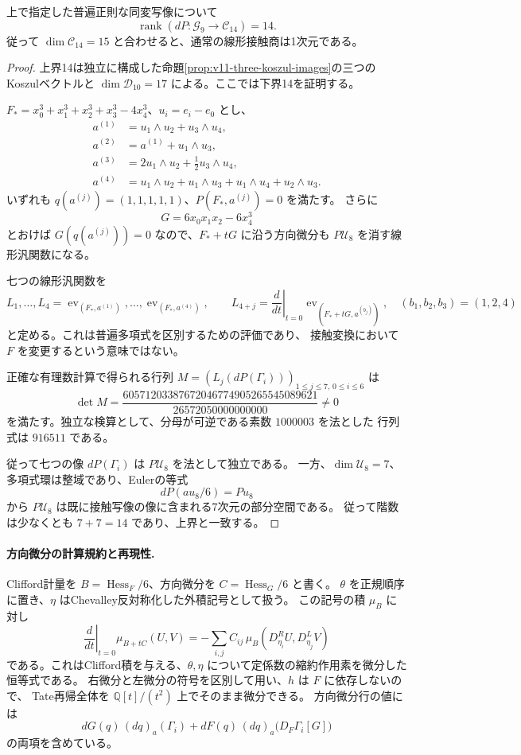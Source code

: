 \begin{proposition}[14次の接触階数]
\label{prop:v11-contact-rank-fourteenth}
上で指定した普遍正則な同変写像について
\[
 \operatorname{rank}(dP\colon\mathcal G_9\longrightarrow\mathcal C_{14})=14.
\]
従って $\dim\mathcal C_{14}=15$ と合わせると、通常の線形接触商は1次元である。
\end{proposition}
\begin{proof}
上界14は独立に構成した命題\ref{prop:v11-three-koszul-images}の三つのKoszulベクトルと
$\dim\mathcal D_{10}=17$ による。ここでは下界14を証明する。

$F_*=x_0^3+x_1^3+x_2^3+x_3^3-4x_4^3$、$u_i=e_i-e_0$ とし、
\begin{align*}
 a^{(1)}&=u_1\wedge u_2+u_3\wedge u_4,\\
 a^{(2)}&=a^{(1)}+u_1\wedge u_3,\\
 a^{(3)}&=2u_1\wedge u_2+\tfrac12u_3\wedge u_4,\\
 a^{(4)}&=u_1\wedge u_2+u_1\wedge u_3
              +u_1\wedge u_4+u_2\wedge u_3.
\end{align*}
いずれも $q(a^{(j)})=(1,1,1,1,1)$、$P(F_*,a^{(j)})=0$ を満たす。
さらに
\[
 G=6x_0x_1x_2-6x_4^3
\]
とおけば $G(q(a^{(j)}))=0$ なので、$F_*+tG$ に沿う方向微分も
$P\mathcal U_8$ を消す線形汎関数になる。

七つの線形汎関数を
\[
 L_1,\ldots,L_4=\operatorname{ev}_{(F_*,a^{(1)})},\ldots,
                   \operatorname{ev}_{(F_*,a^{(4)})},
 \qquad
 L_{4+j}=\left.\frac{d}{dt}\right|_{t=0}
             \operatorname{ev}_{(F_*+tG,a^{(b_j)})},
 \quad (b_1,b_2,b_3)=(1,2,4)
\]
と定める。これは普遍多項式を区別するための評価であり、
接触変換において $F$ を変更するという意味ではない。

正確な有理数計算で得られる行列
$M=(L_j(dP(\Gamma_i)))_{1\le j\le7,\,0\le i\le6}$ は
\[
 \det M=
 \frac{60571203387672046774905265545089621}{26572050000000000}\ne0
\]
を満たす。独立な検算として、分母が可逆である素数 $1000003$ を法とした
行列式は $916511$ である。

従って七つの像 $dP(\Gamma_i)$ は $P\mathcal U_8$ を法として独立である。
一方、$\dim\mathcal U_8=7$、多項式環は整域であり、Eulerの等式
\[
 dP(a u_8/6)=P u_8
\]
から $P\mathcal U_8$ は既に接触写像の像に含まれる7次元の部分空間である。
従って階数は少なくとも $7+7=14$ であり、上界と一致する。
\end{proof}

\paragraph{方向微分の計算規約と再現性.}
Clifford計量を $B=\operatorname{Hess}_F/6$、方向微分を
$C=\operatorname{Hess}_G/6$ と書く。
$\theta$ を正規順序に置き、$\eta$ はChevalley反対称化した外積記号として扱う。
この記号の積 $\mu_B$ に対し
\[
 \left.\frac{d}{dt}\right|_{t=0}\mu_{B+tC}(U,V)
 =-\sum_{i,j} C_{ij}\,
       \mu_B(D^R_{\eta_i}U,D^L_{\eta_j}V)
\]
である。これはClifford積を与える、$\theta,\eta$ について定係数の縮約作用素を微分した恒等式である。
右微分と左微分の符号を区別して用い、$h$ は $F$ に依存しないので、
Tate再帰全体を $\mathbb Q[t]/(t^2)$ 上でそのまま微分できる。
方向微分行の値には
\[
 dG(q)\,(dq)_a(\Gamma_i)
 +dF(q)\,(dq)_a\bigl(D_F\Gamma_i[G]\bigr)
\]
の両項を含めている。

